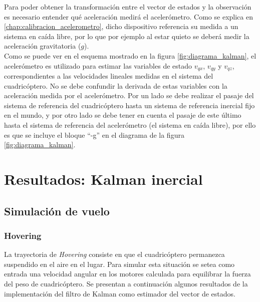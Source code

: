 \documentclass[main]{subfiles}
\begin{document}
Para poder obtener la transformación entre el vector de estados y la observación es necesario entender qué aceleración medirá el acelerómetro. Como se explica en \ref{chap:calibracion_acelerometro}, dicho dispositivo referencia su medida a un sistema en caída libre, por lo que por ejemplo al estar quieto se deberá medir la aceleración gravitatoria ($g$).\\
Como se puede ver en el esquema mostrado en la figura \ref{fig:diagrama_kalman}, el acelerómetro es utilizado para estimar las variables de estado $v_{qx}$, $v_{qy}$ y $v_{qz}$, correspondientes a las velocidades lineales medidas en el sistema del cuadricóptero. No se debe confundir la derivada de estas variables con la aceleración medida por el acelerómetro. Por un lado se debe realizar el pasaje del sistema de referencia del cuadricóptero hasta un sistema de referencia inercial fijo en el mundo, y por otro lado se debe tener en cuenta el pasaje de este último hasta el sistema de referencia del acelerómetro (el sistema en caída libre), por ello es que se incluye el bloque ``-g'' en el diagrama de la figura \ref{fig:diagrama_kalman}.



\section{Resultados: Kalman inercial}

\subsection{Simulación de vuelo}
\subsubsection{Hovering}
La trayectoria de \emph{Hovering} consiste en que el cuadricóptero permanezca suspendido en el aire en el lugar. Para simular esta situación se setea como entrada una velocidad angular en los motores calculada para equilibrar la fuerza del peso de cuadricóptero.
Se presentan a continuación algunos resultados de la implementación del filtro de Kalman como estimador del vector de estados.\\
\end{document}
